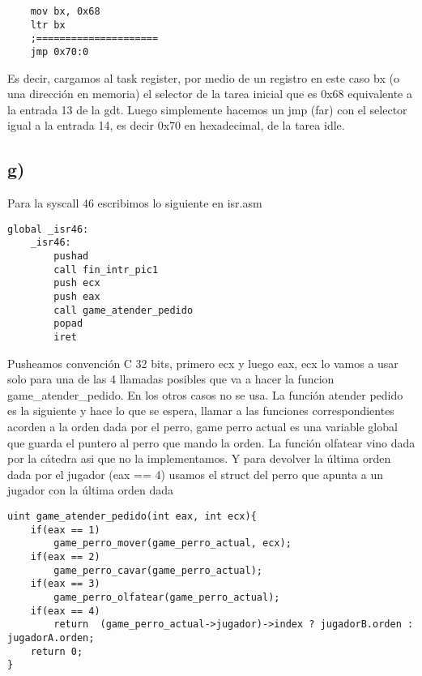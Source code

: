 \begin{codesnippet}
\begin{verbatim}
    mov bx, 0x68            
    ltr bx                  
    ;=====================
    jmp 0x70:0               

\end{verbatim}
\end{codesnippet}

Es decir, cargamos al task register, por medio de un registro en este caso bx (o una dirección en memoria) el selector de la tarea inicial que es 0x68 equivalente a la entrada 13 de la gdt. Luego simplemente hacemos un jmp (far) con el selector igual a la entrada
14, es decir 0x70 en hexadecimal, de la tarea idle. 


\subsection*{g)}
Para la syscall 46 escribimos lo siguiente en isr.asm

\begin{codesnippet}
\begin{verbatim}
global _isr46:
    _isr46:
        pushad
        call fin_intr_pic1
        push ecx
        push eax
        call game_atender_pedido
        popad
        iret 
\end{verbatim}
\end{codesnippet}

Pusheamos convención C 32 bits, primero ecx y luego eax, ecx lo vamos a usar solo para una de las 4 llamadas posibles que va a hacer la funcion game\_atender\_pedido. En los otros casos no se usa. La función atender pedido es la siguiente
y hace lo que se espera, llamar a las funciones correspondientes acorden a la orden dada por el perro, game perro actual es una variable global que guarda el puntero al perro que mando la orden. La función olfatear vino dada por la cátedra asi que no
la implementamos. Y para devolver la última orden dada por el jugador (eax == 4) usamos el struct del perro que apunta a un jugador con la última orden dada

\begin{codesnippet}
\begin{verbatim}
uint game_atender_pedido(int eax, int ecx){
    if(eax == 1)
        game_perro_mover(game_perro_actual, ecx);
    if(eax == 2)
        game_perro_cavar(game_perro_actual);
    if(eax == 3)
        game_perro_olfatear(game_perro_actual);
    if(eax == 4)
        return  (game_perro_actual->jugador)->index ? jugadorB.orden : jugadorA.orden;
    return 0;
}
\end{verbatim}
\end{codesnippet}

